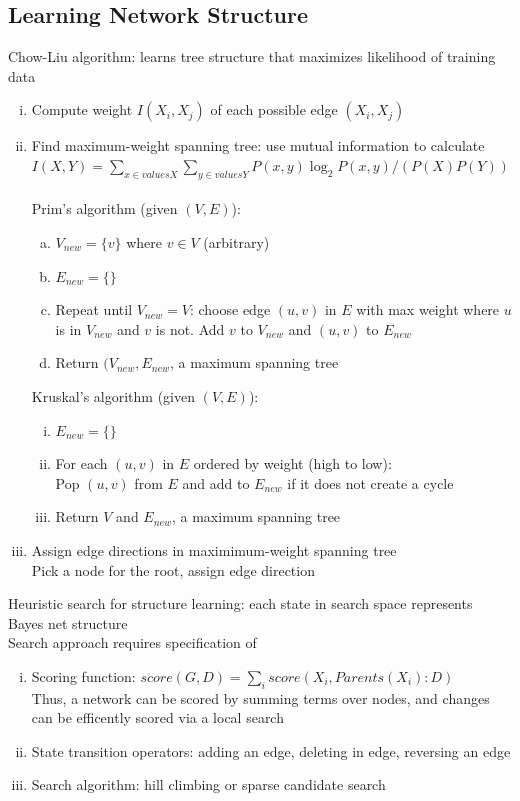 \documentclass{article}
\begin{document}
		\subsection{Learning Network Structure}
			Chow-Liu algorithm: learns tree structure that maximizes likelihood of training data
			\begin{enumerate}[(i)]
				\item Compute weight $I(X_i, X_j)$ of each possible edge $(X_i, X_j)$
				\item Find maximum-weight spanning tree: use mutual information to calculate \\
				$I(X, Y) = \sum_{x \in values{X}}\sum_{y \in values{Y}} P(x, y)\log_2 P(x, y)/(P(X)P(Y))$ \\
				\\
				Prim's algorithm (given $(V, E)$):
				\begin{enumerate}[(a)]
					\item $V_{new} = \{v\}$ where $v \in V$ (arbitrary)
					\item $E_{new} = \{\}$
					\item Repeat until $V_{new} = V$: choose edge $(u, v)$ in $E$ with max weight where $u$ is in $V_{new}$ and $v$ is not. Add $v$ to $V_{new}$ and $(u, v)$ to $E_{new}$
					\item Return $(V_{new}, E_{new}$, a maximum spanning tree
					\end{enumerate}
				Kruskal's algorithm (given $(V, E)$):
				\begin{enumerate}[(i)]
					\item $E_{new} = \{\}$
					\item For each $(u, v)$ in $E$ ordered by weight (high to low): \\
					Pop $(u, v)$ from $E$ and add to $E_{new}$ if it does not create a cycle
					\item Return $V$ and $E_{new}$, a maximum spanning tree
					\end{enumerate}
				\item Assign edge directions in maximimum-weight spanning tree \\
				Pick a node for the root, assign edge direction
				\end{enumerate}
			Heuristic search for structure learning: each state in search space represents Bayes net structure \\
			Search approach requires specification of
			\begin{enumerate}[(i)]
				\item Scoring function: $score(G, D) = \sum_i score(X_i, Parents(X_i):D)$ \\
				Thus, a network can be scored by summing terms over nodes, and changes can be efficently scored via a local search
				\item State transition operators: adding an edge, deleting in edge, reversing an edge
				\item Search algorithm: hill climbing or sparse candidate search
				\end{enumerate}
\end{document}
